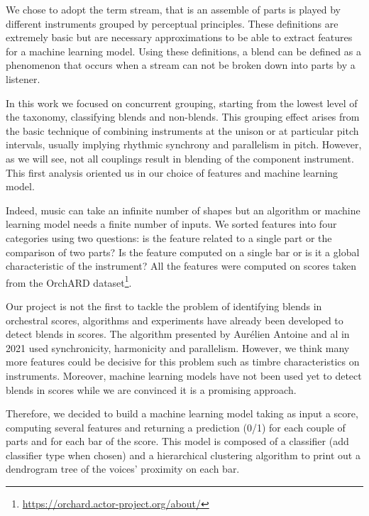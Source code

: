 \documentclass[11pt, a4paper]{article}
\begin{document}
We chose to adopt the term stream, that is an assemble of parts is played by different instruments grouped by perceptual principles.
These definitions are extremely basic but are necessary approximations to be able to extract features for a machine learning model.
Using these definitions, a blend can be defined as a phenomenon that occurs when a stream can not be broken down into parts by a listener.


In this work we focused on concurrent grouping, starting from the lowest level of the taxonomy, classifying blends and non-blends.
This grouping effect arises from the basic technique of combining instruments at the unison or at particular pitch intervals, usually implying rhythmic synchrony and parallelism in pitch.
However, as we will see, not all couplings result in blending of the component instrument.
This first analysis oriented us in our choice of features and machine learning model\cite{mcadams_taxonomy_2022}.

Indeed, music can take an infinite number of shapes but an algorithm or machine learning model needs a finite number of inputs\cite{Marsden2016}.
We sorted features into four categories using two questions: is the feature related to a single part or the comparison of two parts?
Is the feature computed on a single bar or is it a global characteristic of the instrument?
All the features were computed on scores taken from the OrchARD dataset\footnote[1]{\url{https://orchard.actor-project.org/about/}}.


Our project is not the first to tackle the problem of identifying blends in orchestral scores, algorithms and experiments have already been developed to detect blends in scores.
The algorithm presented by Aurélien Antoine and al in 2021 used synchronicity, harmonicity and parallelism\cite{Antoine_blends}.
However, we think many more features could be decisive for this problem such as timbre characteristics on instruments\cite{spectral_envelope_Lembke}.
Moreover, machine learning models have not been used yet to detect blends in scores while we are convinced it is a promising approach.

Therefore, we decided to build a machine learning model taking as input a score, computing several features and returning a prediction (0/1) for each couple of parts and for each bar of the score.
This model is composed of a classifier (add classifier type when chosen) and a hierarchical clustering algorithm to print out a dendrogram tree of the voices' proximity on each bar.
\end{document}
